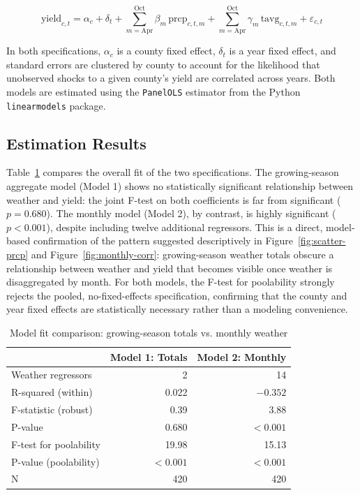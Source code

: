 \documentclass{article}
\begin{document}
\begin{equation}
\text{yield}_{c,t} = \alpha_c + \delta_t + \sum_{m=\text{Apr}}^{\text{Oct}} \beta_m \, \text{prcp}_{c,t,m} + \sum_{m=\text{Apr}}^{\text{Oct}} \gamma_m \, \text{tavg}_{c,t,m} + \varepsilon_{c,t}
\label{eq:monthly}
\end{equation}

In both specifications, $\alpha_c$ is a county fixed effect, $\delta_t$ is a year fixed effect, and standard errors are clustered by county to account 
for the likelihood that unobserved shocks to a given county's yield are correlated across years. Both models are estimated using the \texttt{PanelOLS} 
estimator from the Python \texttt{linearmodels} package.

\subsection{Estimation Results}

Table~\ref{tab:model-comparison} compares the overall fit of the two specifications. The growing-season aggregate model (Model 1) shows no statistically significant 
relationship between weather and yield: the joint F-test on both coefficients is far from significant ($p = 0.680$). 
The monthly model (Model 2), by contrast, is highly significant ($p < 0.001$), despite including twelve additional regressors. 
This is a direct, model-based confirmation of the pattern suggested descriptively in Figure~\ref{fig:scatter-prcp} and 
Figure~\ref{fig:monthly-corr}: growing-season weather totals obscure a relationship between weather and yield that becomes visible 
once weather is disaggregated by month. For both models, the F-test for poolability strongly rejects the pooled, no-fixed-effects specification, 
confirming that the county and year fixed effects are statistically necessary rather than a modeling convenience.

\begin{table}[h]
\centering
\caption{Model fit comparison: growing-season totals vs. monthly weather}
\label{tab:model-comparison}
\begin{tabular}{lrr}
\toprule
 & Model 1: Totals & Model 2: Monthly \\
\midrule
Weather regressors & 2 & 14 \\
R-squared (within) & 0.022 & $-0.352$ \\
F-statistic (robust) & 0.39 & 3.88 \\
P-value & 0.680 & $<0.001$ \\
F-test for poolability & 19.98 & 15.13 \\
P-value (poolability) & $<0.001$ & $<0.001$ \\
N & 420 & 420 \\
\bottomrule
\end{tabular}
\end{table}
\end{document}
